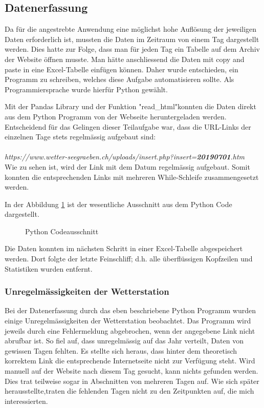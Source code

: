 \begin{refsection}
\subsection{Datenerfassung}
Da f\"ur die angestrebte Anwendung eine m\"oglichst hohe Aufl\"osung der jeweiligen Daten erforderlich ist, mussten die Daten im Zeitraum von einem Tag dargestellt werden.
Dies hatte zur Folge, dass man f\"ur jeden Tag ein Tabelle auf dem Archiv der Website \"offnen musste. Man hätte anschliessend die Daten mit copy and paste in eine Excel-Tabelle einf\"ugen können. Daher wurde  entschieden, ein Programm zu schreiben, welches diese Aufgabe automatisieren sollte.
Als Programmiersprache wurde hierf\"ur Python gewählt.


Mit der Pandas Library und der Funktion "read\_html"\space konnten die Daten direkt aus dem Python Programm von der Webseite heruntergeladen werden.
Entscheidend für das Gelingen dieser Teilaufgabe war, dass die URL-Links der einzelnen Tage stets regelmässig aufgebaut sind:\\
\\
\textit{https://www.wetter-seegraeben.ch/uploads/insert.php?insert=\textbf{20190701}.htm}
\\

Wie zu sehen ist, wird der Link mit dem Datum regelmässig aufgebaut. Somit konnten die entsprechenden Links mit mehreren While-Schleife zusammengesetzt werden.

In der Abbildung \ref{fig:python-code} ist der wesentliche Ausschnitt aus dem Python Code dargestellt.
\begin{figure}
	\centering
	
	\caption{Python Codeausschnitt}
	\label{fig:python-code}
\end{figure}

Die Daten konnten im nächsten Schritt in einer Excel-Tabelle abgespeichert werden.
Dort folgte der letzte Feinschliff; d.h. alle überflüssigen Kopfzeilen und Statistiken wurden entfernt.

\subsubsection{Unregelmässigkeiten der Wetterstation}
Bei der Datenerfassung durch das eben beschriebene Python Programm wurden einige Unregelmässigkeiten der Wetterstation beobachtet.
Das Programm wird jeweils durch eine Fehlermeldung abgebrochen, wenn der angegebene Link nicht abrufbar ist. 
So fiel auf, dass unregelmässig auf das Jahr verteilt, Daten von gewissen Tagen fehlten. Es stellte sich heraus, dass hinter dem theoretisch korrektem Link die entsprechende Internetseite nicht zur Verfügung steht.
Wird manuell auf der Website nach diesem Tag gesucht, kann nichts gefunden werden.
Dies trat teilweise sogar in Abschnitten von mehreren Tagen auf.
Wie sich später herausstellte,traten die fehlenden Tagen nicht zu den Zeitpunkten auf, die mich interessierten.



\end{refsection}
